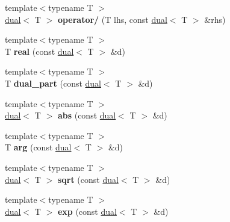 \begin{DoxyCompactItemize}
\item 
\hypertarget{namespace_d_r_d_s_p_a275cdf7c3b5a9ee9966fcef81e599d78}{{\footnotesize template$<$typename T $>$ }\\\hyperlink{struct_d_r_d_s_p_1_1dual}{dual}$<$ T $>$ {\bfseries operator/} (T lhs, const \hyperlink{struct_d_r_d_s_p_1_1dual}{dual}$<$ T $>$ \&rhs)}\label{namespace_d_r_d_s_p_a275cdf7c3b5a9ee9966fcef81e599d78}

\item 
\hypertarget{namespace_d_r_d_s_p_a4eab38618729bd439b92c0686f8835a9}{{\footnotesize template$<$typename T $>$ }\\T {\bfseries real} (const \hyperlink{struct_d_r_d_s_p_1_1dual}{dual}$<$ T $>$ \&d)}\label{namespace_d_r_d_s_p_a4eab38618729bd439b92c0686f8835a9}

\item 
\hypertarget{namespace_d_r_d_s_p_a3c9e977644af809869f112e367caadb9}{{\footnotesize template$<$typename T $>$ }\\T {\bfseries dual\-\_\-part} (const \hyperlink{struct_d_r_d_s_p_1_1dual}{dual}$<$ T $>$ \&d)}\label{namespace_d_r_d_s_p_a3c9e977644af809869f112e367caadb9}

\item 
\hypertarget{namespace_d_r_d_s_p_a129a80d5db6fc98a0052597e156abaff}{{\footnotesize template$<$typename T $>$ }\\\hyperlink{struct_d_r_d_s_p_1_1dual}{dual}$<$ T $>$ {\bfseries abs} (const \hyperlink{struct_d_r_d_s_p_1_1dual}{dual}$<$ T $>$ \&d)}\label{namespace_d_r_d_s_p_a129a80d5db6fc98a0052597e156abaff}

\item 
\hypertarget{namespace_d_r_d_s_p_a15969842b2014288e34f312be339f5ee}{{\footnotesize template$<$typename T $>$ }\\T {\bfseries arg} (const \hyperlink{struct_d_r_d_s_p_1_1dual}{dual}$<$ T $>$ \&d)}\label{namespace_d_r_d_s_p_a15969842b2014288e34f312be339f5ee}

\item 
\hypertarget{namespace_d_r_d_s_p_a5223ce10411e0547739bb603a3a4b5fa}{{\footnotesize template$<$typename T $>$ }\\\hyperlink{struct_d_r_d_s_p_1_1dual}{dual}$<$ T $>$ {\bfseries sqrt} (const \hyperlink{struct_d_r_d_s_p_1_1dual}{dual}$<$ T $>$ \&d)}\label{namespace_d_r_d_s_p_a5223ce10411e0547739bb603a3a4b5fa}

\item 
\hypertarget{namespace_d_r_d_s_p_a0c6fce852ec748b5dde1e2026a5396f1}{{\footnotesize template$<$typename T $>$ }\\\hyperlink{struct_d_r_d_s_p_1_1dual}{dual}$<$ T $>$ {\bfseries exp} (const \hyperlink{struct_d_r_d_s_p_1_1dual}{dual}$<$ T $>$ \&d)}\label{namespace_d_r_d_s_p_a0c6fce852ec748b5dde1e2026a5396f1}


\end{DoxyCompactItemize}

